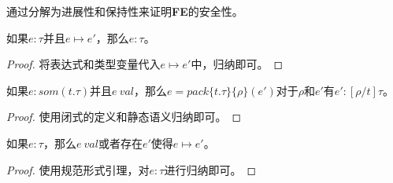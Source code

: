 通过分解为进展性和保持性来证明\textbf{FE}的安全性。

\begin{theorem}[保持性]
如果$e:\tau$并且$e \longmapsto e'$，那么$e:\tau$。
\end{theorem}

\begin{proof}
将表达式和类型变量代入$e \longmapsto e'$中，归纳即可。
\end{proof}

\begin{lemma}[规范形式]
如果$e:som(t.\tau)$并且$e\ val$，那么$e=pack\{t.\tau\}\{\rho\}(e')$对于$\rho$和$e'$有$e':[\rho/t]\tau$。
\end{lemma}

\begin{proof}
使用闭式的定义和静态语义归纳即可。
\end{proof}

\begin{theorem}[进展性]
如果$e:\tau$，那么$e\ val$或者存在$e'$使得$e \longmapsto e'$。
\end{theorem}

\begin{proof}
使用规范形式引理，对$e:\tau$进行归纳即可。
\end{proof}

